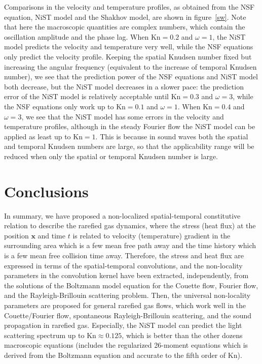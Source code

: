 \documentclass[lineno]{jfm}
\begin{document}
Comparisons in the velocity and temperature profiles, as obtained from the NSF equation, NiST model and the Shakhov model, are shown in figure~\ref{sw}. Note that here the macroscopic quantities are complex numbers, which contain the oscillation amplitude and the phase lag. When $\text{Kn}=0.2$ and $\omega=1$, the NiST model predicts the velocity and temperature very well, while the NSF equations only predict the velocity profile. Keeping the spatial Knudsen number fixed but increasing the angular frequency (equivalent to the increase of temporal Knudsen number), we see that the prediction power of the NSF equations and NiST model both decrease, but the NiST model decreases in a slower pace: the prediction error of the NiST model is relatively acceptable until $\text{Kn} = 0.3$ and $\omega = 3$, while the NSF equations only work up to $\text{Kn} = 0.1$ and $\omega = 1$. 
When $\text{Kn} = 0.4$ and $\omega = 3$, we see that the NiST model has some errors in the velocity and temperature profiles, although in the steady Fourier flow the NiST model can be applied as least up to $\text{Kn} = 1$. This is because in sound waves both the spatial and temporal Knudsen numbers are large, so that the applicability range will be reduced when only the spatial or temporal Knudsen number is large. 


\section{Conclusions}\label{conclusion}
In summary, we have proposed a non-localized spatial-temporal constitutive relation to describe the rarefied gas dynamics, where the stress (heat flux) at the position $\bm{x}$ and time $t$ is related to velocity (temperature) gradient in the surrounding area which is a few mean free path away and the time history which is a few mean free collision time away. Therefore, the stress and heat flux are expressed in terms of the spatial-temporal convolutions, and the non-locality parameters in the convolution kernel have been extracted, independently, from the solutions of the Boltzmann model equation for the Couette flow, Fourier flow, and the Rayleigh-Brillouin scattering problem. Then, the universal non-locality parameters are proposed for general rarefied gas flows, which work well in the Couette/Fourier flow, spontaneous Rayleigh-Brillouin scattering, and the sound propagation in rarefied gas. Especially, the NiST model can predict the light scattering spectrum up to $\text{Kn}\approx 0.125$, which is better than the other dozens macroscopic equations (includes the regularized 26-moment equations which is derived from the Boltzmann equation and accurate to the fifth order of Kn).
\end{document}
